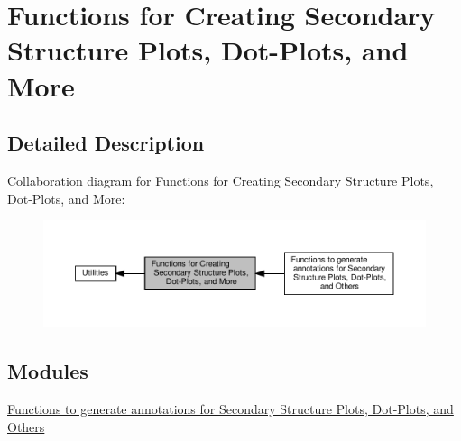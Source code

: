 \hypertarget{group__plotting__utils}{}\section{Functions for Creating Secondary Structure Plots, Dot-\/\+Plots, and More}
\label{group__plotting__utils}


\subsection{Detailed Description}
Collaboration diagram for Functions for Creating Secondary Structure Plots, Dot-\/\+Plots, and More\+:
\nopagebreak
\begin{figure}[H]
\begin{center}
\leavevmode
\includegraphics[width=350pt]{group__plotting__utils}
\end{center}
\end{figure}
\subsection*{Modules}
\begin{DoxyCompactItemize}
\item 
\hyperlink{group__annotation__utils}{Functions to generate annotations for Secondary Structure Plots, Dot-\/\+Plots, and Others}
\end{DoxyCompactItemize}
